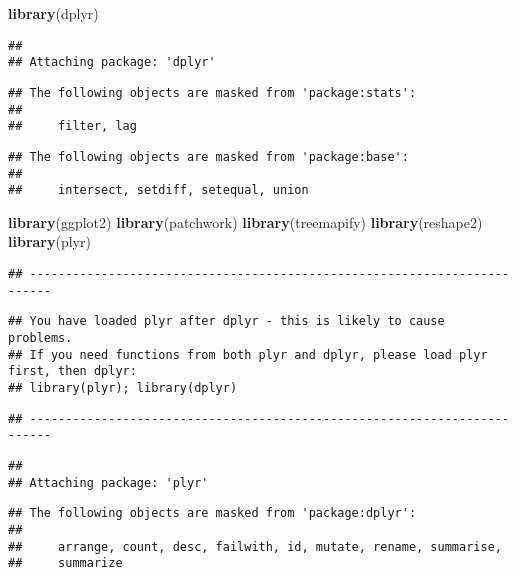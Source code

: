 \documentclass[]{article}
\author{}
\date{\vspace{-2.5em}}
\newenvironment{Shaded}{\begin{snugshade}}{\end{snugshade}}
\newcommand{\KeywordTok}[1]{\textcolor[rgb]{0.13,0.29,0.53}{\textbf{#1}}}
\newcommand{\NormalTok}[1]{#1}
\begin{document}
\begin{Shaded}
\begin{Highlighting}[]
\KeywordTok{library}\NormalTok{(dplyr)}
\end{Highlighting}
\end{Shaded}

\begin{verbatim}
## 
## Attaching package: 'dplyr'
\end{verbatim}

\begin{verbatim}
## The following objects are masked from 'package:stats':
## 
##     filter, lag
\end{verbatim}

\begin{verbatim}
## The following objects are masked from 'package:base':
## 
##     intersect, setdiff, setequal, union
\end{verbatim}

\begin{Shaded}
\begin{Highlighting}[]
\KeywordTok{library}\NormalTok{(ggplot2)}
\KeywordTok{library}\NormalTok{(patchwork)}
\KeywordTok{library}\NormalTok{(treemapify)}
\KeywordTok{library}\NormalTok{(reshape2)}
\KeywordTok{library}\NormalTok{(plyr)}
\end{Highlighting}
\end{Shaded}

\begin{verbatim}
## -------------------------------------------------------------------------
\end{verbatim}

\begin{verbatim}
## You have loaded plyr after dplyr - this is likely to cause problems.
## If you need functions from both plyr and dplyr, please load plyr first, then dplyr:
## library(plyr); library(dplyr)
\end{verbatim}

\begin{verbatim}
## -------------------------------------------------------------------------
\end{verbatim}

\begin{verbatim}
## 
## Attaching package: 'plyr'
\end{verbatim}

\begin{verbatim}
## The following objects are masked from 'package:dplyr':
## 
##     arrange, count, desc, failwith, id, mutate, rename, summarise,
##     summarize
\end{verbatim}
\end{document}
